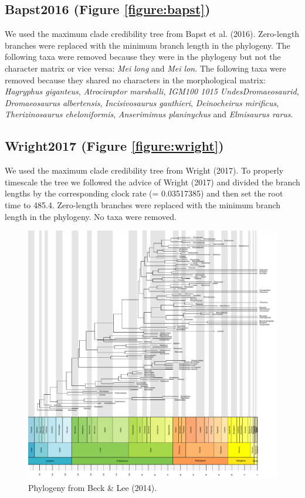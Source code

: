 \documentclass[12pt,a4paper]{article}
\begin{document}
\subsection{Bapst2016 (Figure \ref{figure:bapst})} 
We used the maximum clade credibility tree from Bapst et al. (2016).
Zero-length branches were replaced with the minimum branch length in the phylogeny.
The following taxa were removed because they were in the phylogeny but not the character matrix or vice versa: \textit{Mei long} and \textit{Mei lon}. 
The following taxa were removed because they shared no characters in the morphological matrix: \textit{Hagryphus giganteus}, \textit{Atrociraptor marshalli}, \textit{IGM100 1015 UndesDromaeosaurid}, \textit{Dromaeosaurus albertensis}, \textit{Incisivosaurus gauthieri}, \textit{Deinocheirus mirificus}, \textit{Therizinosaurus cheloniformis},  \textit{Anserimimus planinychus} and \textit{Elmisaurus rarus}. 

\subsection{Wright2017 (Figure \ref{figure:wright})}
We used the maximum clade credibility tree from Wright (2017). 
To properly timescale the tree we followed the advice of Wright (2017) and divided the branch lengths by the corresponding clock rate (= 0.03517385)  and then set the root time to 485.4. 
Zero-length branches were replaced with the minimum branch length in the phylogeny.
No taxa were removed. 

\begin{figure}[!htbp]
    \centering
    \includegraphics[width=1\linewidth, height=1\textheight, keepaspectratio]{figures/fig-tree-Beck2014-appendix.pdf}
    \caption[Beck2014.]
    {Phylogeny from Beck \& Lee (2014).}
    \label{figure:beck}
  \end{figure} 
\end{document}

